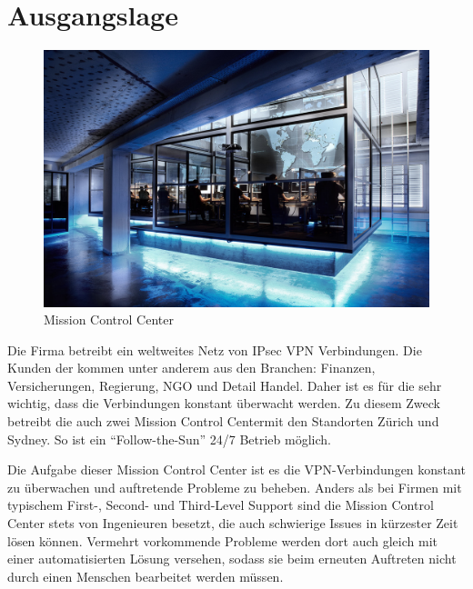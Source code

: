 \section{Ausgangslage}
\label{sec:Ausgangslage}

\begin{figure}
  \begin{center}
    \includegraphics[clip,scale=0.15]{mainpart/anforderungen/img/gallery_mc_01}
    \caption{Mission Control Center}
  \end{center}
\end{figure}


Die Firma \osag{} betreibt ein weltweites Netz von \ac{IPsec} \ac{VPN} Verbindungen. Die Kunden der \osag{} kommen unter anderem aus den Branchen: Finanzen, Versicherungen, Regierung, NGO und Detail Handel. Daher ist es für die \osag{} sehr wichtig, dass die Verbindungen konstant überwacht werden. Zu diesem Zweck betreibt die \osag{} auch zwei Mission Control Center\footnotemark[1] mit den Standorten Zürich und Sydney. So ist ein \enquote{Follow-the-Sun} 24/7 Betrieb möglich.


Die Aufgabe dieser Mission Control Center ist es die \ac{VPN}-Verbindungen konstant zu überwachen und auftretende Probleme zu beheben. Anders als bei Firmen mit typischem First-, Second- und Third-Level Support sind die Mission Control Center stets von Ingenieuren besetzt, die auch schwierige Issues in kürzester Zeit lösen können. Vermehrt vorkommende Probleme werden dort auch gleich mit einer automatisierten Lösung versehen, sodass sie beim erneuten Auftreten nicht durch einen Menschen bearbeitet werden müssen.

